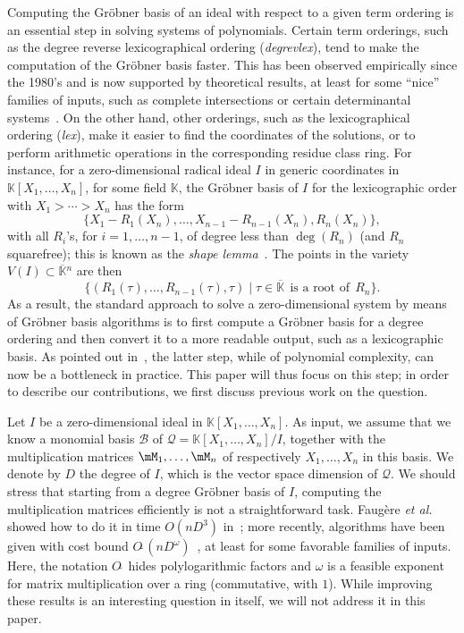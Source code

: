 \documentclass[12pt]{article}
\newcommand{\basis}{\mathscr{B}}
\newcommand{\softO}[1]{O{\tilde{~}}(#1)} %
\newcommand{\residueI}{\mathscr{Q}}
\def\K{\mathbb{K}}
\def\K {\ensuremath{\mathbb{K}}}
\def\Kbar {{\ensuremath{\overline{\mathbb{K}}}}}
\begin{document}
Computing the Gr\"obner basis of an ideal with respect to a given term
ordering is an essential step in solving systems of polynomials.
Certain term orderings, such as the degree reverse lexicographical
ordering (\textit{degrevlex}), tend to make the computation of the
Gr\"obner basis faster. This has been observed empirically since the
1980's and is now supported by theoretical results, at least for some
``nice'' families of inputs, such as complete intersections or certain
determinantal systems~\cite{Faugere02,FaSaSp13,BaFaSa15}.  On the
other hand, other orderings, such as the lexicographical ordering
(\textit{lex}), make it easier to find the coordinates of the
solutions, or to perform arithmetic operations in the corresponding
residue class ring.  For instance, for a zero-dimensional radical
ideal $I$ in generic coordinates in $\K[X_1,\dots,X_n]$, for some
field $\K$, the Gr\"obner basis of $I$ for the lexicographic order
with $X_1 > \cdots > X_n$ has the form
\begin{equation}\label{eq:shapelemma}
 \{ X_1 - R_1(X_n),\dots,X_{n-1}-R_{n-1}(X_n),R_n(X_n)\},
\end{equation}
with all $R_i$'s, for $i =1,\dots,n-1$, of degree less than
$\deg(R_n)$ (and $R_n$ squarefree); this is known as the {\em
  shape lemma}~\cite{GiMo89}. The points in the variety $V(I) \subset
\Kbar{}^n$ are then
  $$\{ ( R_1(\tau), \dots, R_{n-1}(\tau), \tau ) \mid \tau \in \Kbar
  \;\,\text{is a root of}\;\, R_n\}.$$ As a result, the standard approach to
 solve a zero-dimensional system by means of Gr\"obner basis
 algorithms is to first compute a Gr\"obner basis for a degree ordering
 and then convert it to a more readable output, such as a lexicographic
 basis. As pointed out in~\cite{FaMo17}, the latter step, while of
 polynomial complexity, can now be a bottleneck in practice. This
 paper will thus focus on this step; in order to describe our 
 contributions, we first discuss previous work on the question.

 Let $I$ be a zero-dimensional ideal in $\K[X_1,\dots,X_n]$.  As
 input, we assume that we know a monomial basis $\basis$ of
 $\residueI=\K[X_1,\dots,X_n]/I$, together with the multiplication
 matrices $\mM_1,\dots,\mM_n$ of respectively $X_1,\dots,X_n$ in this
 basis. We denote by $D$ the degree of $I$, which is the vector space
 dimension of $\residueI$. We should stress that starting from a
 degree Gr\"obner basis of $I$, computing the multiplication matrices
 efficiently is not a straightforward task. Faug\`ere {\it et al.}
 showed how to do it in time $O(nD^3)$ in~\cite{FaGiLaMo93}; more
 recently, algorithms have been given with cost bound
 $\softO{nD^\omega}$~\cite{FaGaHuRe13,FaGaHuRe14,Neiger16}, at least
 for some favorable families of inputs. Here, the notation
 $O\tilde{~}$ hides polylogarithmic factors and $\omega$ is a feasible
 exponent for matrix multiplication over a ring (commutative, with
 $1$). While improving these results is an interesting question in
 itself, we will not address it in this paper.
\end{document}

